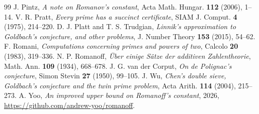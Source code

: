 \documentclass[11pt]{amsart}
\theoremstyle{definition}
\theoremstyle{remark}
\numberwithin{equation}{section}
\begin{document}
\begin{thebibliography}{99}
 J. Pintz, \emph{A note on Romanov's constant}, Acta Math. Hungar. \textbf{112} (2006), 1--14.
 V. R. Pratt, \emph{Every prime has a succinct certificate}, SIAM J. Comput. \textbf{4} (1975), 214--220.
 D. J. Platt and T. S. Trudgian, \emph{Linnik's approximation to Goldbach's conjecture, and other problems}, J. Number Theory \textbf{153} (2015), 54--62.
 F. Romani, \emph{Computations concerning primes and powers of two}, Calcolo \textbf{20} (1983), 319--336.
 N. P. Romanoff, \emph{\"Uber einige S\"atze der additiven Zahlentheorie}, Math. Ann. \textbf{109} (1934), 668--678.
 J. G. van der Corput, \emph{On de Polignac's conjecture}, Simon Stevin \textbf{27} (1950), 99--105.
 J. Wu, \emph{Chen's double sieve, Goldbach's conjecture and the twin prime problem}, Acta Arith. \textbf{114} (2004), 215--273.
 A. Yoo, \emph{An improved upper bound on Romanoff's constant}, 2026, \url{https://github.com/andrew-yoo/romanoff}.
\end{thebibliography}
\end{document}
